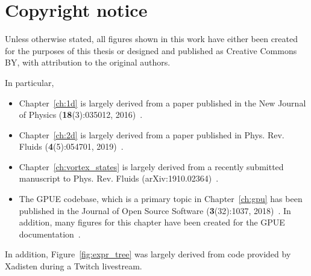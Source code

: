 \chapter{Copyright notice}

Unless otherwise stated, all figures shown in this work have either been created for the purposes of this thesis or designed and published as Creative Commons BY, with attribution to the original authors.

In particular,
\begin{itemize}
\item Chapter~\ref{ch:1d} is largely derived from a paper published in the New Journal of Physics (\textbf{18}(3):035012, 2016)~\cite{schloss2016}.
\item Chapter~\ref{ch:2d} is largely derived from a paper published in Phys. Rev. Fluids (\textbf{4}(5):054701, 2019)~\cite{zhang2019}.
\item Chapter~\ref{ch:vortex_states} is largely derived from a recently submitted manuscript to Phys. Rev. Fluids (arXiv:1910.02364)~\cite{schloss2019}.
\item The GPUE codebase, which is a primary topic in Chapter~\ref{ch:gpu} has been published in the Journal of Open Source Software (\textbf{3}(32):1037, 2018)~\cite{schloss2018}. In addition, many figures for this chapter have been created for the GPUE documentation~\cite{docs}.
\end{itemize}

In addition, Figure~\ref{fig:expr_tree} was largely derived from code provided by Xadisten during a Twitch livestream.

